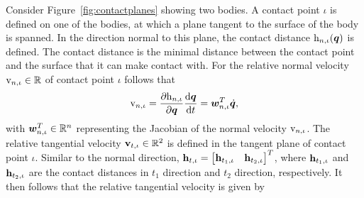 \documentclass[../DC2017114Bouma.tex]{subfiles}
\begin{document}
Consider Figure~\ref{fig:contactplanes} showing two bodies. A contact point $\iota$ is defined on one of the bodies, at which a plane tangent to the surface of the body is spanned. In the direction normal to this plane, the contact distance $\mathrm{h}_{n,\iota}({\boldsymbol{q}})$ is defined. The contact distance is the minimal distance between the contact point and the surface that it can make contact with. For the relative normal velocity $\mathrm{v}_{n,\iota}\in\mathbb{R}$ of contact point $\iota$ follows that
\begin{align}
\mathrm{v}_{n,\iota} = \frac{\partial \mathrm{h}_{n,\iota}}{\partial{\boldsymbol{q}}}\frac{\text{d}{\boldsymbol{q}}}{\text{d} t} = {\boldsymbol{w}}_{n,\iota}^T\dot{{\boldsymbol{q}}},
\end{align}
%
%
%
%
%
%
%
%
%
%
%
%
%
%
%
%
%
%
%
%
%
with ${\boldsymbol{w}}^T_{n,\iota}\in\mathbb{R}^n$ representing the Jacobian of the normal velocity $\mathrm{v}_{n,\iota}$. The relative tangential velocity $\mathbf{v}_{t,\iota}\in\mathbb{R}^2$ is defined in the tangent plane of contact point $\iota$. Similar to the normal direction, $\mathbf{h}_{t,\iota} = \begin{bmatrix} \mathbf{h}_{t_1,\iota} & \mathbf{h}_{t_2,\iota} \end{bmatrix}^T$, where $\mathbf{h}_{t_1,\iota}$ and $\mathbf{h}_{t_2,\iota}$ are the contact distances in $t_1$ direction and $t_2$ direction, respectively. It then follows that the relative tangential velocity is given by
\end{document}
